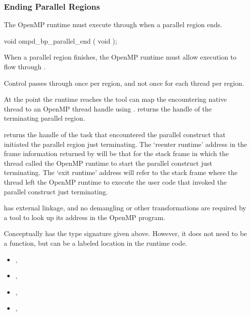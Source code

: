 \subsubsection{Ending Parallel Regions}
\label{subsubsec:ompd_bp_parallel_end}

The OpenMP runtime must execute through 
when a parallel region ends.


\begin{cspecific}
\begin{ompSyntax}
void ompd_bp_parallel_end ( void );
\end{ompSyntax}
\end{cspecific}


\descr

When a parallel region finishes, the OpenMP runtime must allow execution
to flow through .

Control passes through 
once per region, and not once for each thread per region.

At the point the runtime reaches 
the tool can map the encountering native thread
to an OpenMP thread handle using .
returns the handle of the terminating parallel region.

returns the handle of the task that encountered the
parallel construct that initiated the parallel region just
terminating.
The `reenter runtime' address in the frame information returned by
will be that for the stack frame in which the thread called the
OpenMP runtime to start the parallel construct just terminating.
The `exit runtime' address will refer to the stack frame where the
thread left the OpenMP runtime to execute the user code that
invoked the parallel construct just terminating.

\restrictions

 has external  linkage, and no
demangling or other transformations are required by a tool
to look up its address in the OpenMP program.

Conceptually  has the type signature
given above.
However, it does not need to be a function, but can be a labeled location
in the runtime code.

\crossreferences
\begin{itemize}
\item
  , 
\item
  , 
\item
  , 
\item
  , 
\end{itemize}


